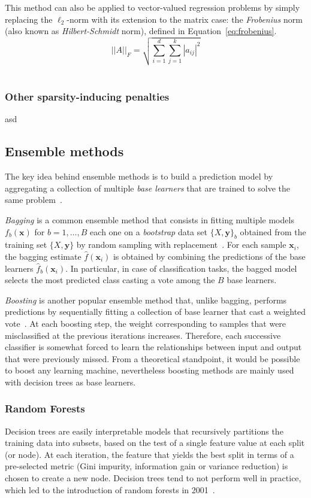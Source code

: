 			This method can also be applied to vector-valued regression problems by simply replacing the $\ell_2$-norm with its extension to the matrix case: the \textit{Frobenius} norm (also known as  \textit{Hilbert-Schmidt} norm), defined in Equation~\eqref{eq:frobenius}.
			\begin{equation}\label{eq:frobenius}
				||A||_F = \sqrt{\sum_{i=1}^d \sum_{j=1}^k |a_{ij}|^2}
			\end{equation}
			~\cite{he2016novel}


			\subsubsection{Other sparsity-inducing penalties}
			asd

	    \subsection{Ensemble methods}
	    The key idea behind ensemble methods is to build a prediction model by aggregating a collection of multiple \textit{base learners} that are trained to solve the same problem~\citep{zhou2012ensemble}.

	    \textit{Bagging} is a common ensemble method that consists in fitting multiple models $f_b(\bm{x})$ for $b=1,\dots,B$ each one on a \textit{bootstrap} data set $\{X,\bm{y}\}_b$ obtained from the training set $\{X,\bm{y}\}$ by random sampling with replacement~\citep{hastie2009elements}. For each sample $\bm{x}_i$, the bagging estimate $\hat{f}(\bm{x}_i)$ is obtained by combining the predictions of the base learners $\hat{f}_b(\bm{x}_i)$. In particular, in case of classification tasks, the bagged model selects the most predicted class casting a vote among the $B$ base learners.

	    \textit{Boosting} is another popular ensemble method that, unlike bagging, performs predictions by sequentially fitting a collection of base learner that cast a weighted vote~\citep{hastie2009elements}. At each boosting step, the weight corresponding to samples that were misclassified at the previous iterations increases. Therefore, each successive classifier is somewhat forced to learn the relationships between input and output that were previously missed. From a theoretical standpoint, it would be possible to boost any learning machine, nevertheless boosting methods are mainly used with decision trees as base learners.


	    \subsubsection{Random Forests}
	    Decision trees are easily interpretable models that recursively partitions the training data into subsets, based on the test of a single feature value at each split (or node). At each iteration, the feature that yields the best split in terms of a pre-selected metric (Gini impurity, information gain or variance reduction) is chosen to create a new node. Decision trees tend to not perform well in practice, which led to the introduction of random forests in 2001~\cite{breiman2001random}.

